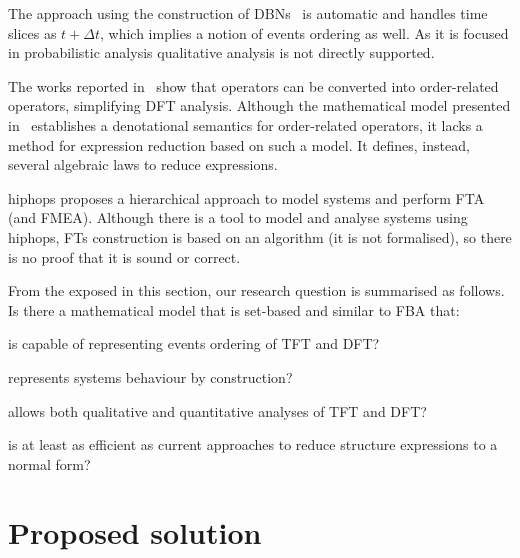 \documentclass[12pt,openright,twoside,a4paper,oldfontcommands,english,brazil,draft]{abntex2}
\theoremstyle{theo}
\begin{document}
The approach using the construction of \acp{DBN}~\cite{BRM+2005} is automatic and handles time slices as $t + \Delta t$, which implies a notion of events ordering as well.
As it is focused in probabilistic analysis qualitative analysis is not directly supported.

The works reported in~\cite{Merle2010,XTD2012} show that  operators can be converted into order-related operators, simplifying \ac{DFT} analysis.
Although the mathematical model presented in~\cite{Merle2010} establishes a denotational semantics for order-related operators, it lacks a method for expression reduction based on such a model.
It defines, instead, several algebraic laws to reduce expressions.

\begin{sloppypar}
\Ac{hiphops} proposes a hierarchical approach to model systems and perform \ac{FTA} (and \ac{FMEA}).
Although there is a tool to model and analyse systems using \ac{hiphops}, \acp{FT} construction is based on an algorithm (it is not formalised), so there is no proof that it is sound or correct.
\end{sloppypar}


From the exposed in this section, our research question is summarised as follows.
Is there a mathematical model that is set-based and similar to \ac{FBA} that:
\begin{alineas}[ref={research question \alph*)}]
  \item is capable of representing events ordering of \ac{TFT} and \ac{DFT}\label{question:ordering-representation}?
  \item represents systems behaviour by construction\label{question:gap}?
  \item allows both qualitative and quantitative analyses of \ac{TFT} and \ac{DFT}\label{question:analyses}?
  \item is at least as efficient as current approaches to reduce structure expressions to a normal form\label{question:efficiency}?
\end{alineas}

\section{Proposed solution}
\end{document}
